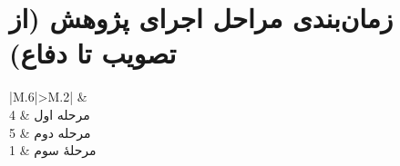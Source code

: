 \section{زمان‌بندی مراحل اجرای پژوهش (از تصویب تا دفاع)}
\begin{center}
	\begin{tabular}{|M{.6}|>{\centering\arraybackslash}M{.2}|}
		\hline
		 &
		 \\ \hline
		مرحله اول & 4
		\\\hline
		مرحله دوم & 5
		\\\hline
		مرحلهٔ سوم & 1
		\\\hline
	\end{tabular}
\end{center}